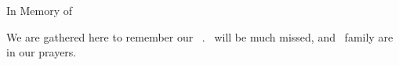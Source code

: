 \documentclass[12pt]{article}
\begin{document}
\begin{center}
\Large
In Memory of \personfullname
\end{center} 

We are gathered here to remember our \personsibling\ \personname.
\Personpronoun\ will be much missed, and \personpossadj\ 
family are in our prayers. 
\end{document}
